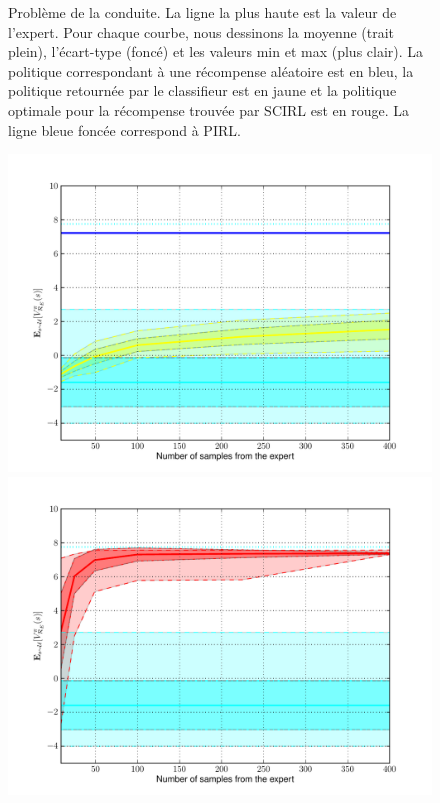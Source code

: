 \documentclass[french,utf8]{./hermes-journal}
\begin{document}
\begin{figure}[fies]{Problème de la conduite. La ligne la plus haute est la valeur de l'expert. Pour chaque courbe, nous dessinons la moyenne (trait plein), l'écart-type (foncé) et les valeurs min et max (plus clair). La politique correspondant à une récompense aléatoire est en bleu, la politique retournée par le classifieur est en jaune et la politique optimale pour la récompense trouvée par SCIRL est en rouge. La ligne bleue foncée correspond à PIRL.}
\begin{minipage}[l]{0.49\linewidth}
\centering
  \centerline{\includegraphics[width=1.2\linewidth]{fig_classif.pdf}}
\end{minipage} \hfill
\begin{minipage}[r]{0.49\linewidth}
\centering
  \centerline{\includegraphics[width=1.2\linewidth]{fig_scirl.pdf}}
\end{minipage}
\end{figure}
\end{document}
